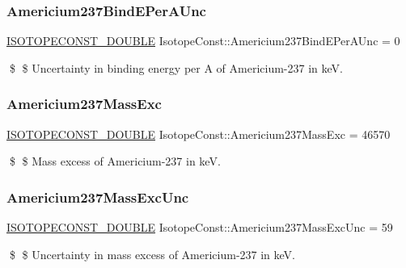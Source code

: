 \subsubsection{\texorpdfstring{Americium237\+Bind\+E\+Per\+A\+Unc}{Americium237BindEPerAUnc}}
{\footnotesize\ttfamily \mbox{\hyperlink{group___isotope_const-_macros_ga8f45a7272ce02c0b4c65c44636ed719a}{I\+S\+O\+T\+O\+P\+E\+C\+O\+N\+S\+T\+\_\+\+D\+O\+U\+B\+LE}} Isotope\+Const\+::\+Americium237\+Bind\+E\+Per\+A\+Unc = 0}

\$ \$ Uncertainty in binding energy per A of Americium-\/237 in keV. \mbox{\label{group___isotope_const-_americium-_am237_ga128beaf10bf3acd423ff7ee06e38d603}} 
\subsubsection{\texorpdfstring{Americium237\+Mass\+Exc}{Americium237MassExc}}
{\footnotesize\ttfamily \mbox{\hyperlink{group___isotope_const-_macros_ga8f45a7272ce02c0b4c65c44636ed719a}{I\+S\+O\+T\+O\+P\+E\+C\+O\+N\+S\+T\+\_\+\+D\+O\+U\+B\+LE}} Isotope\+Const\+::\+Americium237\+Mass\+Exc = 46570}

\$ \$ Mass excess of Americium-\/237 in keV. \mbox{\label{group___isotope_const-_americium-_am237_ga9f5872af2018e62d87a93e4bd0405e9e}} 
\subsubsection{\texorpdfstring{Americium237\+Mass\+Exc\+Unc}{Americium237MassExcUnc}}
{\footnotesize\ttfamily \mbox{\hyperlink{group___isotope_const-_macros_ga8f45a7272ce02c0b4c65c44636ed719a}{I\+S\+O\+T\+O\+P\+E\+C\+O\+N\+S\+T\+\_\+\+D\+O\+U\+B\+LE}} Isotope\+Const\+::\+Americium237\+Mass\+Exc\+Unc = 59}

\$ \$ Uncertainty in mass excess of Americium-\/237 in keV. \mbox{\label{group___isotope_const-_americium-_am237_ga23c60d97dbecd926fa72e0f264c898b0}} 
